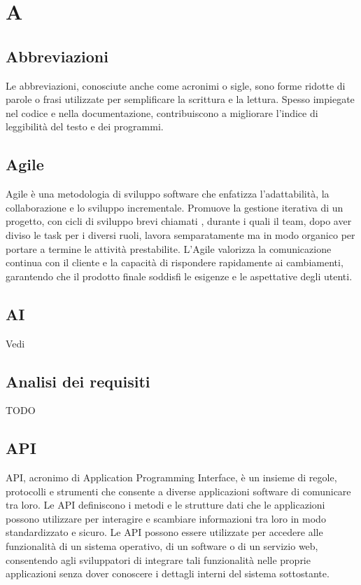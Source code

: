 \section{A}

\vspace{2em}
\subsection*{Abbreviazioni}
Le abbreviazioni, conosciute anche come acronimi o sigle, sono forme ridotte di parole o frasi utilizzate per semplificare la scrittura e la lettura. Spesso impiegate nel codice e nella documentazione, contribuiscono a migliorare l'indice di leggibilità del testo e dei programmi.

\vspace{2em}
\subsection*{Agile}
Agile è una metodologia di sviluppo software che enfatizza l'adattabilità, la collaborazione e lo sviluppo incrementale. Promuove la gestione iterativa di un progetto, con cicli di sviluppo brevi chiamati , durante i quali il team, dopo aver diviso le task per i diversi ruoli, lavora semparatamente ma in modo organico per portare a termine le attività prestabilite. L'Agile valorizza la comunicazione continua con il cliente e la capacità di rispondere rapidamente ai cambiamenti, garantendo che il prodotto finale soddisfi le esigenze e le aspettative degli utenti.

\vspace{2em}
\subsection*{AI}
\par Vedi 

\vspace{2em}
\subsection*{Analisi dei requisiti}
TODO

\vspace{2em}
\subsection*{API}
API, acronimo di Application Programming Interface, è un insieme di regole, protocolli e strumenti che consente a diverse applicazioni software di comunicare tra loro. Le API definiscono i metodi e le strutture dati che le applicazioni possono utilizzare per interagire e scambiare informazioni tra loro in modo standardizzato e sicuro. Le API possono essere utilizzate per accedere alle funzionalità di un sistema operativo, di un software o di un servizio web, consentendo agli sviluppatori di integrare tali funzionalità nelle proprie applicazioni senza dover conoscere i dettagli interni del sistema sottostante.

